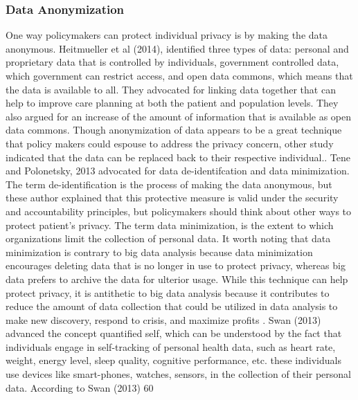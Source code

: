 \documentclass[sigconf]{acmart}
\begin{document}
\subsubsection{Data Anonymization}
One way policymakers can protect individual privacy is by making the data anonymous. Heitmueller et al (2014), identified three types of data: personal and proprietary data that is controlled by individuals, government controlled data, which government can restrict access, and open data commons, which means that the data is available to all. They advocated for linking data together that can help to improve care planning at both the patient and population levels. They also argued for an increase of the amount of information that is available as open data commons. Though anonymization of data appears to be a great technique that policy makers could espouse to address the privacy concern, other study indicated that the data can be replaced back to their respective individual.\cite{van2011health}.
Tene and Polonetsky, 2013 advocated for data de-identifcation and data minimization. The term de-identification is the process of making the data anonymous, but these author explained that this protective measure is valid under the security and accountability principles, but policymakers should think about other ways to protect patient’s privacy. The term data minimization, is the extent to which organizations limit the collection of personal data. It worth noting that data minimization is contrary to big data analysis because data minimization encourages deleting data that is no longer in use to protect privacy, whereas big data prefers to archive the data for ulterior usage. While this technique can help protect privacy, it is antithetic to big data analysis because it contributes to reduce the amount of data collection that could be utilized in data analysis to make new discovery, respond to crisis, and maximize profits \cite{tene2012big}. 
Swan (2013) advanced the concept quantified self, which can be understood by the fact that individuals engage in self-tracking of personal health data, such as heart rate, weight, energy level, sleep quality, cognitive performance, etc. these individuals use devices like smart-phones, watches, sensors, in the collection of their personal data. According to Swan (2013) 60%
\end{document}
